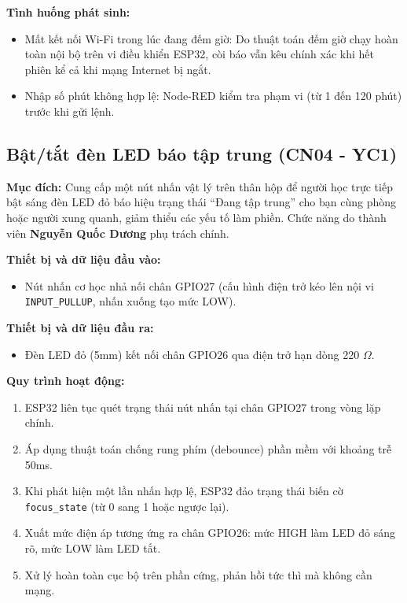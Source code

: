 \textbf{Tình huống phát sinh:}
\begin{itemize}
    \item Mất kết nối Wi-Fi trong lúc đang đếm giờ: Do thuật toán đếm giờ chạy hoàn toàn nội bộ trên vi điều khiển ESP32, còi báo vẫn kêu chính xác khi hết phiên kể cả khi mạng Internet bị ngắt.
    \item Nhập số phút không hợp lệ: Node-RED kiểm tra phạm vi (từ 1 đến 120 phút) trước khi gửi lệnh.
\end{itemize}

\subsection{Bật/tắt đèn LED báo tập trung (CN04 - YC1)}
\textbf{Mục đích:}
Cung cấp một nút nhấn vật lý trên thân hộp để người học trực tiếp bật sáng đèn LED đỏ báo hiệu trạng thái ``Đang tập trung'' cho bạn cùng phòng hoặc người xung quanh, giảm thiểu các yếu tố làm phiền. Chức năng do thành viên \textbf{Nguyễn Quốc Dương} phụ trách chính.

\textbf{Thiết bị và dữ liệu đầu vào:}
\begin{itemize}
    \item Nút nhấn cơ học nhả nối chân GPIO27 (cấu hình điện trở kéo lên nội vi \texttt{INPUT\_PULLUP}, nhấn xuống tạo mức LOW).
\end{itemize}

\textbf{Thiết bị và dữ liệu đầu ra:}
\begin{itemize}
    \item Đèn LED đỏ (5mm) kết nối chân GPIO26 qua điện trở hạn dòng 220 $\Omega$.
\end{itemize}

\textbf{Quy trình hoạt động:}
\begin{enumerate}
    \item ESP32 liên tục quét trạng thái nút nhấn tại chân GPIO27 trong vòng lặp chính.
    \item Áp dụng thuật toán chống rung phím (debounce) phần mềm với khoảng trễ 50ms.
    \item Khi phát hiện một lần nhấn hợp lệ, ESP32 đảo trạng thái biến cờ \texttt{focus\_state} (từ 0 sang 1 hoặc ngược lại).
    \item Xuất mức điện áp tương ứng ra chân GPIO26: mức HIGH làm LED đỏ sáng rõ, mức LOW làm LED tắt.
    \item Xử lý hoàn toàn cục bộ trên phần cứng, phản hồi tức thì mà không cần mạng.
\end{enumerate}

